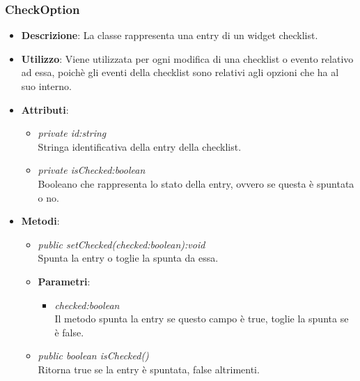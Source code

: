 \subsubsection{CheckOption}
\begin{itemize}
\item \textbf{Descrizione}: La classe rappresenta una entry di un widget checklist.
\item \textbf{Utilizzo}: Viene utilizzata per ogni modifica di una checklist o evento relativo ad essa, poichè gli eventi della checklist sono relativi agli opzioni che ha al suo interno.
\item \textbf{Attributi}:
	\begin{itemize}
	\item \textit{private id:string}\\
	Stringa identificativa della entry della checklist.
	\item \textit{private isChecked:boolean}\\
	Booleano che rappresenta lo stato della entry, ovvero se questa è spuntata o no.
	\end{itemize}
\item \textbf{Metodi}:
	\begin{itemize}
	\item \textit{public setChecked(checked:boolean):void}\\
	Spunta la entry o toglie la spunta da essa.
		\item{\textbf{Parametri}: \begin{itemize}
		\item \textit{checked:boolean}\\
		Il metodo spunta la entry se questo campo è true, toglie la spunta se è false.
		\end{itemize}}
	\item \textit{public boolean isChecked()}\\
	Ritorna true se la entry è spuntata, false altrimenti.
	\end{itemize}
\end{itemize}

